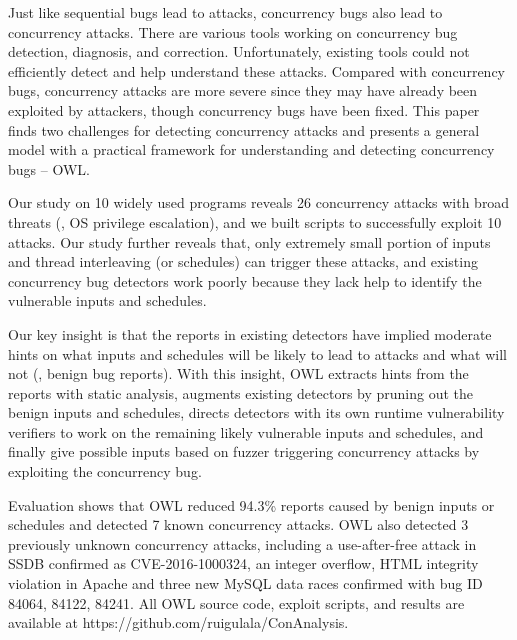 Just like sequential bugs lead to attacks, concurrency bugs also lead to concurrency attacks. There are various tools working on concurrency bug detection, diagnosis, and correction. Unfortunately, existing tools could not efficiently detect and help 
understand these attacks. Compared with concurrency bugs, concurrency attacks are more severe since they may have already been exploited by attackers, though concurrency bugs have been fixed. 
This paper finds two challenges for detecting concurrency attacks and presents a general model with a practical framework for understanding and detecting concurrency bugs -- OWL.

Our study on 10 widely used programs reveals 26 concurrency attacks
with broad threats (\eg, OS privilege escalation), and we built
scripts to successfully exploit 10 attacks. Our study further reveals
that, only extremely small portion of inputs and thread
interleaving (or schedules) can trigger these attacks, and existing
concurrency bug detectors work poorly because they
lack help to identify the vulnerable inputs and schedules.

Our key insight is that the reports in existing detectors have
implied moderate hints on what inputs and schedules will be likely to lead to attacks and what will not (\eg, benign bug reports).
With this insight, OWL extracts hints from the reports with static analysis, augments existing detectors by pruning out the benign inputs
and schedules, directs detectors with its own runtime
vulnerability verifiers to work on the remaining likely
vulnerable inputs and schedules, and finally give possible inputs based on fuzzer triggering concurrency attacks by exploiting the concurrency bug.

Evaluation shows that OWL reduced 94.3\% reports caused
by benign inputs or schedules and detected 7 known concurrency
attacks. OWL also detected 3 previously unknown
concurrency attacks, including a use-after-free attack in SSDB
confirmed as CVE-2016-1000324, an integer overflow,
HTML integrity violation in Apache and three new MySQL
data races confirmed with bug ID 84064, 84122, 84241. All
OWL source code, exploit scripts, and results are available at
https://github.com/ruigulala/ConAnalysis.